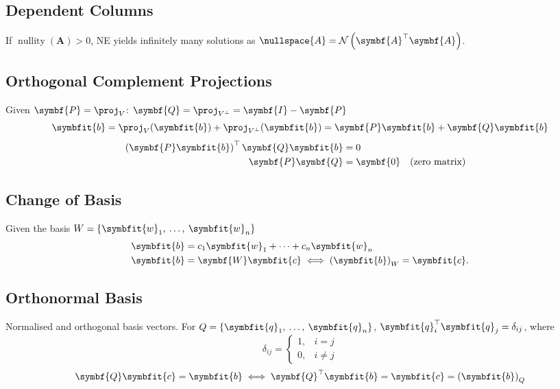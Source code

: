 \documentclass{article}
\DeclareMathOperator*{\nullity}{nullity}
\begin{document}
\begin{multicols*}{3}
    \subsection{Dependent Columns}
    If \(\nullity{\left( \symbf{A} \right)} > 0\), NE yields infinitely many solutions
    as \(\nullspace{A} = \mathcal{N}\left(\symbf{A}^\top \symbf{A}\right)\).
    \subsection{Orthogonal Complement Projections}
    Given \(\symbf{P} = \proj_V\): \(\symbf{Q} = \proj_{V^\perp} = \symbf{I} - \symbf{P}\)
    \begin{equation*}
        \symbfit{b} = \proj_V(\symbfit{b}) + \proj_{V^\perp}(\symbfit{b}) = \symbf{P}\symbfit{b} + \symbf{Q}\symbfit{b}
    \end{equation*}
    \begin{align*}
        \left( \symbf{P}\symbfit{b} \right)^\top \symbf{Q}\symbfit{b} & = 0                                   \\
        \symbf{P} \symbf{Q}                                           & = \symbf{0} &  & \text{(zero matrix)}
    \end{align*}
    \subsection{Change of Basis}
    Given the basis \(W = \left\{ \symbfit{w}_1,\: \dots,\: \symbfit{w}_n \right\}\)
    \begin{align*}
        \symbfit{b} & = c_1 \symbfit{w}_1 + \cdots + c_n \symbfit{w}_n                         \\
        \symbfit{b} & = \symbf{W} \symbfit{c} \iff \left( \symbfit{b} \right)_W = \symbfit{c}.
    \end{align*}
    \subsection{Orthonormal Basis}
    Normalised and orthogonal basis vectors.
    For \(Q = \left\{ \symbfit{q}_1,\: \dots,\: \symbfit{q}_n \right\}\),
    \(\symbfit{q}_i^\top \symbfit{q}_j = \delta_{ij}\), where
    \begin{equation*}
        \delta_{ij} = \begin{cases}
            1, & i = j   \\
            0, & i \ne j
        \end{cases}
    \end{equation*}
    \begin{equation*}
        \symbf{Q} \symbfit{c} = \symbfit{b}
        \iff
        \symbf{Q}^\top \symbfit{b} = \symbfit{c} = \left( \symbfit{b} \right)_Q
    \end{equation*}

\end{multicols*}
\end{document}
